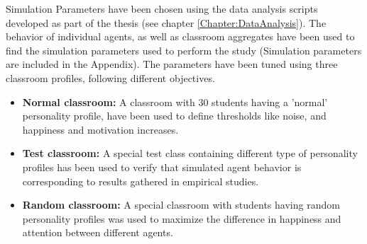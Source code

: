 \bb

Simulation Parameters have been chosen using the data analysis scripts developed
as part of the thesis (see chapter \ref{Chapter:DataAnalysis}). The behavior
of individual agents, as well as classroom aggregates have been used to find
the simulation parameters used to perform the study (Simulation parameters are included
in the Appendix). The parameters have been tuned using three classroom profiles,
following different objectives.

\begin{itemize}
    \item \textbf{Normal classroom:} A classroom with 30 students having a 'normal'
    personality profile, have been used to define thresholds like noise, and happiness
    and motivation increases.
    \item \textbf{Test classroom:} A special test class containing different type of
    personality profiles has been used to verify that simulated agent behavior is
    corresponding to results gathered in empirical studies.
    \item \textbf{Random classroom:} A special classroom with students having random
    personality profiles was used to maximize the difference in happiness and attention
    between different agents.
\end{itemize}
